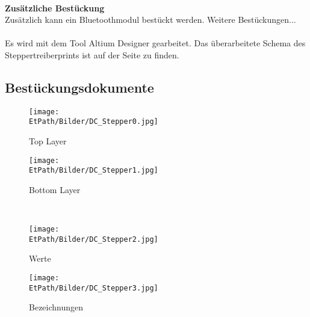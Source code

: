     \\
    \textbf{Zusätzliche Bestückung}\\
    Zusätzlich kann ein Bluetoothmodul bestückt werden. Weitere 
    Bestückungen...\\\\
    Es wird mit dem Tool Altium Designer gearbeitet. Das überarbeitete Schema 
    des Steppertreiberprints ist auf der Seite \pageref{Schema} zu finden. 
    
    \newpage
    \subsection*{Bestückungsdokumente}
    \begin{figure}[h!]
        \centering
        \begin{minipage}[hbt]{6cm}
            \centering
            \texttt{[image: \\EtPath/Bilder/DC\_Stepper0.jpg]}
            \caption{Top Layer}
            \label{fig:Top Layer}
        \end{minipage}
        \hspace{1.5cm}
        \begin{minipage}[hbt]{6cm}
            \centering
            \texttt{[image: \\EtPath/Bilder/DC\_Stepper1.jpg]}
            \caption{Bottom Layer}
            \label{fig:Bottom Layer}
        \end{minipage}
        \\[4ex]
        \begin{minipage}[hbt]{6cm}
            \centering
            \texttt{[image: \\EtPath/Bilder/DC\_Stepper2.jpg]}
            \caption{Werte}
            \label{fig:Werte}
        \end{minipage}
        \hspace{1.5cm}
        \begin{minipage}[hbt]{6cm}
            \centering
            \texttt{[image: \\EtPath/Bilder/DC\_Stepper3.jpg]}
            \caption{Bezeichnungen}
            \label{fig:Bezeichnungen}
        \end{minipage}
    \end{figure}
    \ifSTANDALONE
